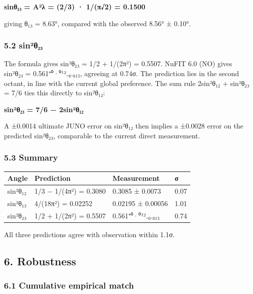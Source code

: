 \documentclass[
  11pt,
  letterpaper,
]{article}
\begin{document}
\textbf{sinθ₁₃ = A²λ = (2/3) · 1/(π√2) = 0.1500}

giving θ₁₃ = 8.63°, compared with the observed 8.56° ± 0.10°.

\hypertarget{sinuxb2ux3b8ux2082ux2083}{%
\subsubsection{5.2 sin²θ₂₃}\label{sinuxb2ux3b8ux2082ux2083}}

The formula gives sin²θ₂₃ = 1/2 + 1/(2π²) = 0.5507. NuFIT 6.0 (NO) gives
sin²θ₂₃ = 0.561⁺⁰·⁰¹²₋₀.₀₁₅, agreeing at 0.74σ. The prediction lies in
the second octant, in line with the current global preference. The sum
rule 2sin²θ₁₂ + sin²θ₂₃ = 7/6 ties this directly to sin²θ₁₂:

\textbf{sin²θ₂₃ = 7/6 − 2sin²θ₁₂}

A ±0.0014 ultimate JUNO error on sin²θ₁₂ then implies a ±0.0028 error on
the predicted sin²θ₂₃, comparable to the current direct measurement.

\hypertarget{summary}{%
\subsubsection{5.3 Summary}\label{summary}}

\begin{longtable}[]{@{}llll@{}}
\toprule\noalign{}
Angle & Prediction & Measurement & σ \\
\midrule\noalign{}
\endhead
\bottomrule\noalign{}
\endlastfoot
sin²θ₁₂ & 1/3 − 1/(4π²) = 0.3080 & 0.3085 ± 0.0073 & 0.07 \\
sin²θ₁₃ & 4/(18π²) = 0.02252 & 0.02195 ± 0.00056 & 1.01 \\
sin²θ₂₃ & 1/2 + 1/(2π²) = 0.5507 & 0.561⁺⁰·⁰¹²₋₀.₀₁₅ & 0.74 \\
\end{longtable}

All three predictions agree with observation within 1.1σ.

\hypertarget{robustness}{%
\subsection{6. Robustness}\label{robustness}}

\hypertarget{cumulative-empirical-match}{%
\subsubsection{6.1 Cumulative empirical
match}\label{cumulative-empirical-match}}
\end{document}
